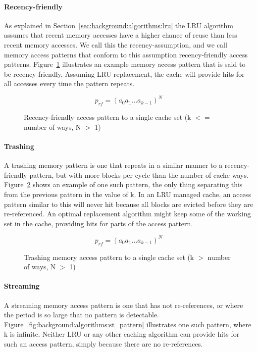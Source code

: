 \paragraph{Recency-friendly}
As explained in Section~\ref{sec:background:algorithms:lru} the LRU algorithm assumes that recent memory accesses have a higher chance of reuse than less recent memory accesses.
We call this the recency-assumption, and we call memory access patterns that conform to this assumption recency-friendly access patterns.
Figure~\ref{fig:background:algorithms:rf_pattern} illustrates an example memory access pattern that is said to be recency-friendly.
Assuming LRU replacement, the cache will provide hits for all accesses every time the pattern repeats.

\begin{figure}[ht]
\centering
\begin{equation}
p_{rf} = (a_0 a_1 ... a_{k-1})^N
\end{equation}
\caption{Recency-friendly access pattern to a single cache set (k $<=$ number of ways, N $>$ 1)}
\label{fig:background:algorithms:rf_pattern}
\end{figure}

\paragraph{Trashing}
A trashing memory pattern is one that repeats in a similar manner to a recency-friendly pattern, but with more blocks per cycle than the number of cache ways. 
Figure~\ref{fig:background:algorithms:tr_pattern} shows an example of one such pattern, the only thing separating this from the previous pattern in the value of k.
In an LRU managed cache, an access pattern similar to this will never hit because all blocks are evicted before they are re-referenced.
An optimal replacement algorithm might keep some of the working set in the cache, providing hits for parts of the access pattern.
\begin{figure}[ht]
\centering
\begin{equation}
p_{rf} = (a_0 a_1 ... a_{k-1})^N
\end{equation}
\caption{Trashing memory access pattern to a single cache set (k $>$ number of ways, N $>$ 1)}
\label{fig:background:algorithms:tr_pattern}
\end{figure}

\paragraph{Streaming}
A streaming memory access pattern is one that has not re-references, or where the period is so large that no pattern is detectable.
Figure~\ref{fig:background:algorithms:st_pattern} illustrates one such pattern, where k is infinite.
Neither LRU or any other caching algorithm can provide hits for such an access pattern, simply because there are no re-references.

